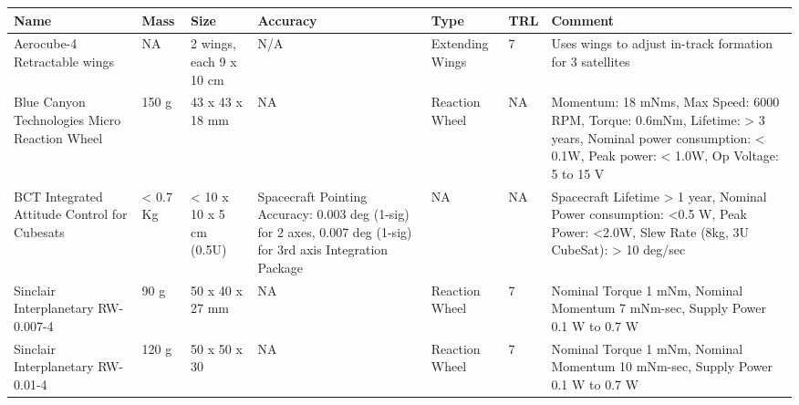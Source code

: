 \begin{center}
     \begin{tabular}{ | p{2cm} | p{1.25cm} | p{2cm} | p{2cm} | p{2cm} | p{1cm} | p{5cm} |}
     \hline
      {\bf Name} & {\bf Mass} & {\bf Size} & {\bf Accuracy} & {\bf Type} & {\bf TRL} & {\bf Comment}  \\ \hline
      
	  Aerocube-4 Retractable wings \cite{Gangestad} & NA & 2 wings, each 9 x 10 cm & N/A & Extending Wings & 7 & Uses wings to adjust in-track formation for 3 satellites \\ \hline
	  
	  Blue Canyon Technologies Micro Reaction Wheel \cite{BCT} & 150 g & 43 x 43 x 18 mm & NA & Reaction Wheel & NA & Momentum: 18 mNms, Max Speed: 6000 RPM, Torque: 0.6mNm, Lifetime: > 3 years, Nominal power consumption: < 0.1W, Peak power: < 1.0W, Op Voltage: 5 to 15 V \\ \hline
	  
	  BCT Integrated Attitude Control for Cubesats \cite{BCT} & < 0.7 Kg & < 10 x 10 x 5 cm (0.5U) & Spacecraft Pointing Accuracy: 0.003 deg (1-sig) for 2 axes, 0.007 deg (1-sig) for 3rd axis	Integration Package & NA & NA & Spacecraft Lifetime > 1 year, Nominal Power consumption: <0.5 W, Peak Power: <2.0W, Slew Rate (8kg, 3U CubeSat): > 10 deg/sec   \\ \hline
	 
	 Sinclair Interplanetary RW-0.007-4 \cite{Sinclair} & 90 g & 50 x 40 x 27 mm & NA & Reaction Wheel & 7 & Nominal Torque 1 mNm, Nominal Momentum 7 mNm-sec, Supply Power 0.1 W to 0.7 W \\ \hline

	Sinclair Interplanetary RW-0.01-4 \cite{Sinclair} & 120 g & 50 x 50 x 30 & NA & Reaction Wheel & 7 & Nominal Torque 1 mNm, Nominal Momentum 10 mNm-sec, Supply Power 0.1 W to 0.7 W \\ \hline
		  
	 \end{tabular}
\end{center} 

